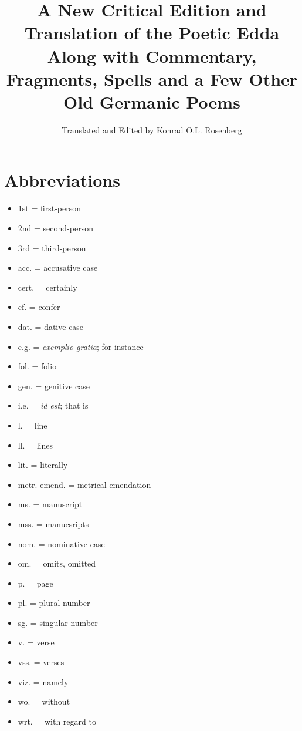 \title{%
  A New Critical Edition and Translation of the Poetic Edda \\
  \large Along with Commentary, Fragments, Spells and a Few Other Old Germanic Poems}

\author{Translated and Edited by Konrad O.L. Rosenberg}

\maketitle

\newpage

\thispagestyle{empty}\tableofcontents

\newpage

\thispagestyle{empty}\section{Abbreviations}
  \begin{itemize}
    \item 1st = first-person
    \item 2nd = second-person
    \item 3rd = third-person
    \item acc. = accusative case
    \item cert. = certainly
    \item cf. = confer
    \item dat. = dative case
    \item e.g. = \emph{exemplio gratia}; for instance
    \item fol. = folio
    \item gen. = genitive case
    \item i.e. = \emph{id est}; that is
    \item l. = line
    \item ll. = lines
    \item lit. = literally
    \item metr. emend. = metrical emendation
    \item ms. = manuscript
    \item mss. = manucsripts
    \item nom. = nominative case
    \item om. = omits, omitted
    \item p. = page
    \item pl. = plural number
    \item sg. = singular number
    \item v. = verse
    \item vss. = verses
    \item viz. = namely
    \item wo. = without
    \item wrt. = with regard to
  \end{itemize}

